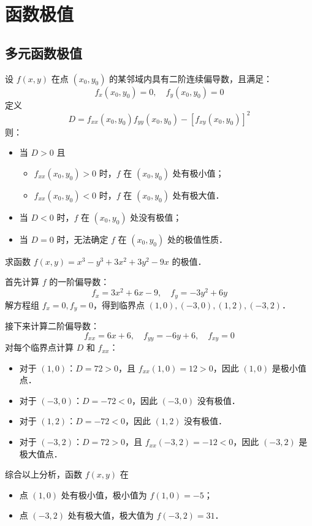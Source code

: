 \documentclass[12pt, a4paper, oneside, UTF8]{ctexbook}
\begin{document}
% 
\else
\fi
\chapter{函数极值}
\section{多元函数极值}
\begin{theorem}
    设 $f(x,y)$ 在点 $(x_0, y_0)$ 的某邻域内具有二阶连续偏导数，且满足：
    \[ f_x(x_0, y_0) = 0, \quad f_y(x_0, y_0) = 0 \]
    定义
    \[ D = f_{xx}(x_0, y_0) f_{yy}(x_0, y_0) - [f_{xy}(x_0, y_0)]^2 \]
    则：
    \begin{itemize}
        \item 当 $D > 0$ 且\begin{itemize}
            \item $f_{xx}(x_0, y_0) > 0$ 时，$f$ 在 $(x_0, y_0)$ 处有极小值；
            \item $f_{xx}(x_0, y_0) < 0$ 时，$f$ 在 $(x_0, y_0)$ 处有极大值．
        \end{itemize}
        \item 当 $D < 0$ 时，$f$ 在 $(x_0, y_0)$ 处没有极值；
        \item 当 $D = 0$ 时，无法确定 $f$ 在 $(x_0, y_0)$ 处的极值性质．
    \end{itemize}
\end{theorem}
\begin{example}
    求函数 $f(x,y) = x^3 - y^3 + 3x^2 + 3y^2 -9x$ 的极值．
\end{example}
\begin{solution}
    首先计算 $f$ 的一阶偏导数：
    \[ f_x = 3x^2 + 6x - 9, \quad f_y = -3y^2 + 6y \]
    解方程组 $f_x = 0, f_y = 0$，得到临界点 $(1,0), (-3,0), (1,2), (-3,2)$．
    
    接下来计算二阶偏导数：
    \[ f_{xx} = 6x + 6, \quad f_{yy} = -6y + 6, \quad f_{xy} = 0 \]
    对每个临界点计算 $D$ 和 $f_{xx}$：
    \begin{itemize}
        \item 对于 $(1,0)$：$D = 72 > 0$，且 $f_{xx}(1,0) = 12 > 0$，因此 $(1,0)$ 是极小值点．
        \item 对于 $(-3,0)$：$D = -72 < 0$，因此 $(-3,0)$ 没有极值．
        \item 对于 $(1,2)$：$D = -72 < 0$，因此 $(1,2)$ 没有极值．
        \item 对于 $(-3,2)$：$D = 72 > 0$，且 $f_{xx}(-3,2) = -12 < 0$，因此 $(-3,2)$ 是极大值点．
    \end{itemize}
    
    综合以上分析，函数 $f(x,y)$ 在\begin{itemize}
        \item 点 $(1,0)$ 处有极小值，极小值为 $\boxed{f(1,0) = -5}$；
        \item 点 $(-3,2)$ 处有极大值，极大值为 $\boxed{f(-3,2) = 31}$．
    \end{itemize}
\end{solution}
\end{document}
